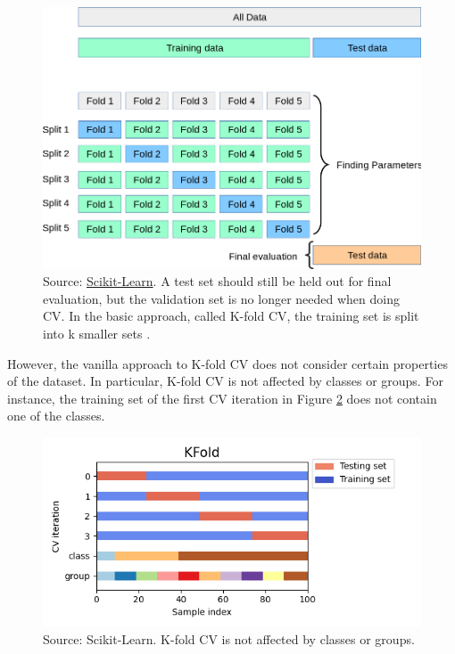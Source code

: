 \documentclass[
]{book}
\begin{document}
\begin{figure}

{\centering \includegraphics[width=0.75\linewidth]{Figures/grid_search_cross_validation} 

}

\caption{Source: \href{https://scikit-learn.org/stable/modules/cross_validation.html\#cross-validation}{Scikit-Learn}. A test set should still be held out for final evaluation, but the validation set is no longer needed when doing CV. In the basic approach, called K-fold CV, the training set is split into k smaller sets \citep{scikit-learn}.}\label{fig:cross-validation}
\end{figure}

However, the vanilla approach to K-fold CV does not consider certain properties of the dataset. In particular, K-fold CV is not affected by classes or groups. For instance, the training set of the first CV iteration in Figure \ref{fig:k-fold-vis} does not contain one of the classes.

\begin{figure}

{\centering \includegraphics[width=0.63\linewidth]{Figures/k-fold-vis} 

}

\caption{Source: Scikit-Learn. K-fold CV is not affected by classes or groups.}\label{fig:k-fold-vis}
\end{figure}
\end{document}
